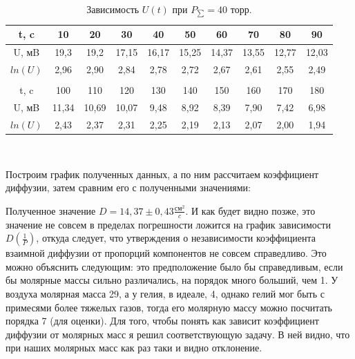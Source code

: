 \documentclass[a4paper,12pt]{article}
\begin{document}
\begin{table}[!h]
	\caption{Зависимость $U(t)$ при $P_{\sum} = 40 $ торр.}
\begin{tabular}{| c | c | c | c | c | c | c | c | c | c |}
\hline
t, c & 10 & 20 & 30 & 40 & 50 & 60 & 70 & 80 & 90  \\ \hline
U, мB & 19,3 & 19,2 & 17,15 & 16,17 & 15,25 & 14,37 & 13,55 & 12,77 & 12,03  \\ \hline
$ln(U)$ & 2,96 & 2,90 & 2,84 & 2,78 & 2,72 & 2,67 & 2,61 & 2,55 & 2,49  \\ \hline
\\  \hline
t, c & 100 & 110 & 120 & 130 & 140 & 150 & 160 & 170 & 180    \\ \hline
U, мB & 11,34 & 10,69 & 10,07 & 9,48 & 8,92 & 8,39 & 7,90 & 7,42 & 6,98  \\ \hline
$ln(U)$ & 2,43 & 2,37 & 2,31 & 2,25 & 2,19 & 2,13 & 2,07 & 2,00 & 1,94 \\ \hline
\end{tabular}\\
\end{table}

Построим график полученных данных, а по ним рассчитаем коэффициент диффузии, затем сравним его с полученными значениями:

\begin{figure}[!h]
\end{figure}

Полученное значение $D = 14,37 \pm 0,43 \frac{\text{см}^2}{c}.$ И как будет видно позже, это значение не совсем в пределах погрешности ложится на график зависимости $D(\frac{1}{P})$, откуда следует, что утверждения о независимости коэффициента взаимной диффузии от пропорций компонентов не совсем справедливо. Это можно объяснить следующим: это предположение было бы справедливым, если бы молярные массы сильно различались, на порядок много больший, чем 1. У воздуха молярная масса 29, а у гелия, в идеале, 4, однако гелий мог быть с примесями более тяжелых газов, тогда его молярную массу можно посчитать порядка 7 (для оценки). Для того, чтобы понять как зависит коэффициент диффузии от молярных масс я решил соответствующую задачу. В ней видно, что при наших молярных масс как раз таки и видно отклонение.
\end{document}
